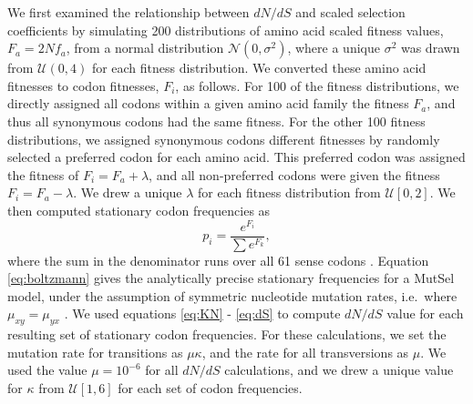 \documentclass[11pt]{article}
\begin{document}
We first examined the relationship between $dN/dS$ and scaled selection coefficients by simulating 200 distributions of amino acid scaled fitness values, $F_a = 2Nf_a$, from a normal distribution $\mathcal{N}(0,\sigma^2)$, where a unique $\sigma^2$ was drawn from $\mathcal{U}(0,4)$ for each fitness distribution. We converted these amino acid fitnesses to codon fitnesses, $F_i$, as follows. For 100 of the fitness distributions, we directly assigned all codons within a given amino acid family the fitness $F_a$, and thus all synonymous codons had the same fitness. For the other 100 fitness distributions, we assigned synonymous codons different fitnesses by randomly selected a preferred codon for each amino acid. This preferred codon was assigned the fitness of $F_i = F_a + \lambda$, and all non-preferred codons were given the fitness $F_i = F_a - \lambda$. We drew a unique $\lambda$ for each fitness distribution from $\mathcal{U}[0,2]$. 
We then computed stationary codon frequencies as 
\begin{equation}\label{eq:boltzmann}
p_i = \frac{e^{F_i}}{\sum e^{F_k}}, 
\end{equation} where the sum in the denominator runs over all 61 sense codons \cite{SellaHirsh2005}. Equation \eqref{eq:boltzmann} gives the analytically precise stationary frequencies for a MutSel model, under the assumption of symmetric nucleotide mutation rates, i.e.\ where $\mu_{xy} = \mu_{yx}$ \cite{SellaHirsh2005}. We used equations \eqref{eq:KN} - \eqref{eq:dS} to compute $dN/dS$ value for each resulting set of stationary codon frequencies. For these calculations, we set the mutation rate for transitions as $\mu\kappa$, and the rate for all transversions as $\mu$. We used the value $\mu = 10^{-6}$ for all $dN/dS$ calculations, and we drew a unique value for $\kappa$ from $\mathcal{U}[1,6]$ for each set of codon frequencies.
\end{document}
